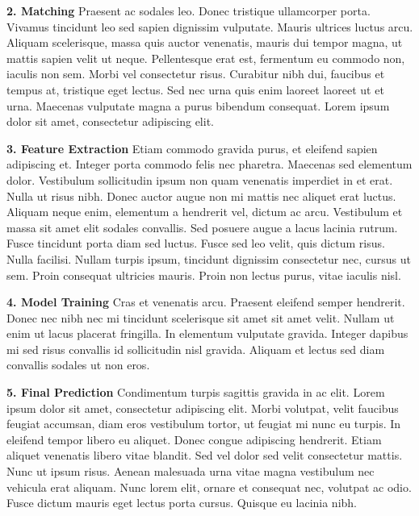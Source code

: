 \documentclass[landscape,final,a1paper,fontscale=0.45]{baposter}
\begin{document}
\begin{poster}
{\textbf{2. Matching} Praesent ac sodales leo. Donec tristique ullamcorper porta. Vivamus tincidunt leo sed sapien dignissim vulputate. Mauris ultrices luctus arcu. Aliquam scelerisque, massa quis auctor venenatis, mauris dui tempor magna, ut mattis sapien velit ut neque. Pellentesque erat est, fermentum eu commodo non, iaculis non sem. Morbi vel consectetur risus. Curabitur nibh dui, faucibus et tempus at, tristique eget lectus. Sed nec urna quis enim laoreet laoreet ut et urna. Maecenas vulputate magna a purus bibendum consequat. Lorem ipsum dolor sit amet, consectetur adipiscing elit.

\textbf{3. Feature Extraction} Etiam commodo gravida purus, et eleifend sapien adipiscing et. Integer porta commodo felis nec pharetra. Maecenas sed elementum dolor. Vestibulum sollicitudin ipsum non quam venenatis imperdiet in et erat. Nulla ut risus nibh. Donec auctor augue non mi mattis nec aliquet erat luctus. Aliquam neque enim, elementum a hendrerit vel, dictum ac arcu. Vestibulum et massa sit amet elit sodales convallis. Sed posuere augue a lacus lacinia rutrum. Fusce tincidunt porta diam sed luctus. Fusce sed leo velit, quis dictum risus. Nulla facilisi. Nullam turpis ipsum, tincidunt dignissim consectetur nec, cursus ut sem. Proin consequat ultricies mauris. Proin non lectus purus, vitae iaculis nisl.  

\textbf{4. Model Training} Cras et venenatis arcu. Praesent eleifend semper hendrerit. Donec nec nibh nec mi tincidunt scelerisque sit amet sit amet velit. Nullam ut enim ut lacus placerat fringilla. In elementum vulputate gravida. Integer dapibus mi sed risus convallis id sollicitudin nisl gravida. Aliquam et lectus sed diam convallis sodales ut non eros.

\textbf{5. Final Prediction} Condimentum turpis sagittis gravida in ac elit. Lorem ipsum dolor sit amet, consectetur adipiscing elit. Morbi volutpat, velit faucibus feugiat accumsan, diam eros vestibulum tortor, ut feugiat mi nunc eu turpis. In eleifend tempor libero eu aliquet. Donec congue adipiscing hendrerit. Etiam aliquet venenatis libero vitae blandit. Sed vel dolor sed velit consectetur mattis. Nunc ut ipsum risus. Aenean malesuada urna vitae magna vestibulum nec vehicula erat aliquam. Nunc lorem elit, ornare et consequat nec, volutpat ac odio. Fusce dictum mauris eget lectus porta cursus. Quisque eu lacinia nibh.

  \begin{center}
  

\end{center}}
\end{poster}
\end{document}
